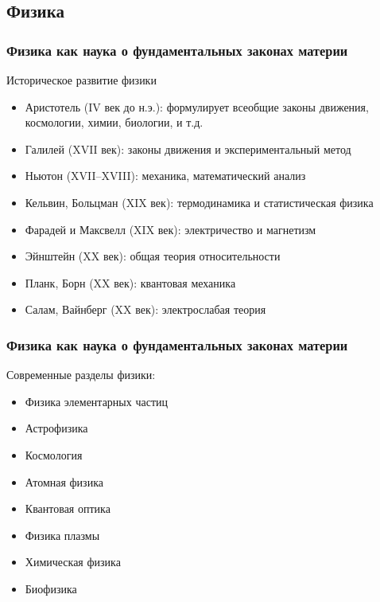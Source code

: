 \subsection{Физика}
\begin{frame}
    \frametitle{Физика как наука о фундаментальных законах материи}
    Историческое развитие физики
    \begin{itemize}[<+->]
        \item Аристотель (IV век до н.э.): формулирует всеобщие законы
            движения, космологии, химии, биологии, и т.д.
        \item Галилей (XVII век): законы движения и экспериментальный
            метод
        \item Ньютон (XVII--XVIII): механика, математический анализ
        \item Кельвин, Больцман (XIX век): термодинамика и
            статистическая физика
        \item Фарадей и Максвелл (XIX век): электричество и магнетизм
        \item Эйнштейн (XX век): общая теория относительности
        \item Планк, Борн (XX век): квантовая механика
        \item Салам, Вайнберг (XX век): электрослабая теория
    \end{itemize}
\end{frame}
\begin{frame}
    \frametitle{Физика как наука о фундаментальных законах материи}
    Современные разделы физики:
    \begin{itemize}[<+->]
        \item Физика элементарных частиц
        \item Астрофизика
        \item Космология
        \item Атомная физика
        \item Квантовая оптика
        \item Физика плазмы
        \item Химическая физика
        \item Биофизика
    \end{itemize}
\end{frame}

